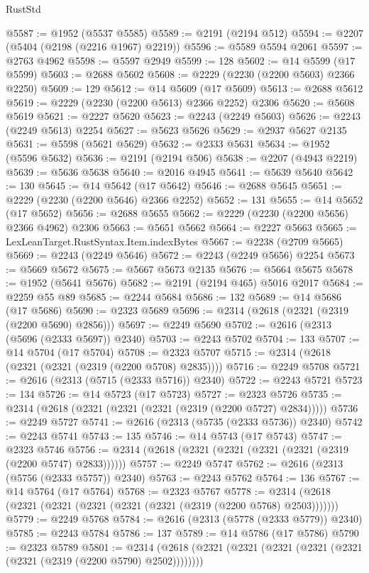 \begin{lexlean}{RustStd}
\begin{coremodule}
@5587 := @1952 (@5537 @5585)
@5589 := @2191 (@2194 @512)
@5594 := @2207 (@5404 (@2198 (@2216 @1967) @2219))
@5596 := @5589 @5594 @2061
@5597 := @2763 @4962
@5598 := @5597 @2949
@5599 := 128
@5602 := @14 @5599 (@17 @5599)
@5603 := @2688 @5602
@5608 := @2229 (@2230 (@2200 @5603) @2366 @2250)
@5609 := 129
@5612 := @14 @5609 (@17 @5609)
@5613 := @2688 @5612
@5619 := @2229 (@2230 (@2200 @5613) @2366 @2252) @2306
@5620 := @5608 @5619
@5621 := @2227 @5620
@5623 := @2243 (@2249 @5603)
@5626 := @2243 (@2249 @5613) @2254
@5627 := @5623 @5626
@5629 := @2937 @5627 @2135
@5631 := @5598 (@5621 @5629)
@5632 := @2333 @5631
@5634 := @1952 (@5596 @5632)
@5636 := @2191 (@2194 @506)
@5638 := @2207 (@4943 @2219)
@5639 := @5636 @5638
@5640 := @2016 @4945
@5641 := @5639 @5640
@5642 := 130
@5645 := @14 @5642 (@17 @5642)
@5646 := @2688 @5645
@5651 := @2229 (@2230 (@2200 @5646) @2366 @2252)
@5652 := 131
@5655 := @14 @5652 (@17 @5652)
@5656 := @2688 @5655
@5662 := @2229 (@2230 (@2200 @5656) @2366 @4962) @2306
@5663 := @5651 @5662
@5664 := @2227 @5663
@5665 := LexLeanTarget.RustSyntax.Item.indexBytes
@5667 := @2238 (@2709 @5665)
@5669 := @2243 (@2249 @5646)
@5672 := @2243 (@2249 @5656) @2254
@5673 := @5669 @5672
@5675 := @5667 @5673 @2135
@5676 := @5664 @5675
@5678 := @1952 (@5641 @5676)
@5682 := @2191 (@2194 @465) @5016 @2017
@5684 := @2259 @55 @89
@5685 := @2244 @5684
@5686 := 132
@5689 := @14 @5686 (@17 @5686)
@5690 := @2323 @5689
@5696 := @2314 (@2618 (@2321 (@2319 (@2200 @5690) @2856)))
@5697 := @2249 @5690
@5702 := @2616 (@2313 (@5696 (@2333 @5697)) @2340)
@5703 := @2243 @5702
@5704 := 133
@5707 := @14 @5704 (@17 @5704)
@5708 := @2323 @5707
@5715 := @2314 (@2618 (@2321 (@2321 (@2319 (@2200 @5708) @2835))))
@5716 := @2249 @5708
@5721 := @2616 (@2313 (@5715 (@2333 @5716)) @2340)
@5722 := @2243 @5721
@5723 := 134
@5726 := @14 @5723 (@17 @5723)
@5727 := @2323 @5726
@5735 := @2314 (@2618 (@2321 (@2321 (@2321 (@2319 (@2200 @5727) @2834)))))
@5736 := @2249 @5727
@5741 := @2616 (@2313 (@5735 (@2333 @5736)) @2340)
@5742 := @2243 @5741
@5743 := 135
@5746 := @14 @5743 (@17 @5743)
@5747 := @2323 @5746
@5756 := @2314 (@2618 (@2321 (@2321 (@2321 (@2321 (@2319 (@2200 @5747) @2833))))))
@5757 := @2249 @5747
@5762 := @2616 (@2313 (@5756 (@2333 @5757)) @2340)
@5763 := @2243 @5762
@5764 := 136
@5767 := @14 @5764 (@17 @5764)
@5768 := @2323 @5767
@5778 := @2314 (@2618 (@2321 (@2321 (@2321 (@2321 (@2321 (@2319 (@2200 @5768) @2503)))))))
@5779 := @2249 @5768
@5784 := @2616 (@2313 (@5778 (@2333 @5779)) @2340)
@5785 := @2243 @5784
@5786 := 137
@5789 := @14 @5786 (@17 @5786)
@5790 := @2323 @5789
@5801 := @2314 (@2618 (@2321 (@2321 (@2321 (@2321 (@2321 (@2321 (@2319 (@2200 @5790) @2502))))))))

\end{coremodule}
\end{lexlean}
